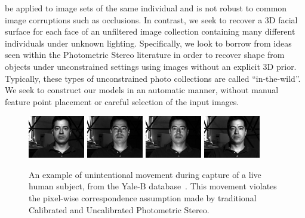 be applied to image sets of the same individual and is not robust to common
image corruptions such as occlusions. In contrast, we seek to recover a 3D
facial surface for each face of an unfiltered image collection containing
many different individuals under unknown lighting.
Specifically, we look to borrow from ideas seen within the Photometric Stereo
literature in order to recover shape from objects under unconstrained settings
using images without an explicit 3D prior. Typically, these types of unconstrained
photo collections are called ``in-the-wild''. We seek to construct our models in
an automatic manner, without manual feature point placement or careful selection
of the input images.
\begin{figure}
    \hspace*{\fill}
    \includegraphics[width=0.22\textwidth]{collection_ps/images/yaleb/yaleB06_P00A+000E+20} \hfill
    \includegraphics[width=0.22\textwidth]{collection_ps/images/yaleb/yaleB06_P00A+000E-20} \hfill
    \includegraphics[width=0.22\textwidth]{collection_ps/images/yaleb/yaleB06_P00A+005E-10} \hfill
    \includegraphics[width=0.22\textwidth]{collection_ps/images/yaleb/yaleB06_P00A-020E+10}
    \hspace*{\fill}
    \caption{An example of unintentional movement during capture of a live
             human subject, from the Yale-B database~\cite{georghiades2001fromfew}.
             This movement violates the pixel-wise correspondence assumption
             made by traditional Calibrated and Uncalibrated Photometric
             Stereo.}
\label{fig:imag_coll_yaleb_movement_example}
\end{figure}

